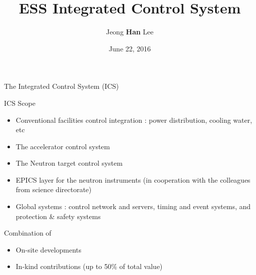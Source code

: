 \documentclass[
  9pt
  , table
  , ignorenonframetext
]{beamer}
\title{ESS Integrated Control System}
\author{Jeong \textbf{Han} Lee}%
\institute{
  Integrated Control System Division\\
  \textbf{ESS}, Sweden
}
\date{June 22, 2016}
\begin{document}
 
\begin{frame}[plain]
  \titlepage
\end{frame}


\begin{frame}{The Integrated Control System (ICS)}
  \begin{block}{ICS Scope}
    \begin{itemize}
    \item Conventional facilities control integration : power distribution, cooling water, etc
    \item The accelerator control system
    \item The Neutron target control system
    \item EPICS layer for the neutron instruments (in cooperation with the colleagues from science directorate)
    \item Global systems : control network and servers, timing and event systems, and protection \& safety systems
    \end{itemize}
  \end{block}
  \begin{exampleblock}{Combination of}
    \begin{itemize}
    \item On-site developments 
    \item In-kind contributions (up to 50\% of total value)
    \end{itemize}
  \end{exampleblock}
\end{frame}
\end{document}
